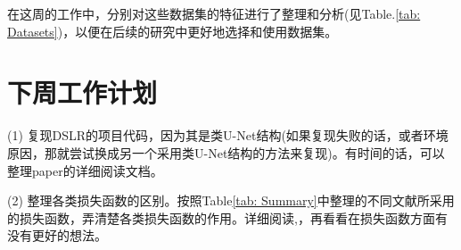 \documentclass[letterpaper,12pt]{article}
\begin{document}
		
		在这周的工作中，分别对这些数据集的特征进行了整理和分析(见Table.\ref{tab: Datasets})，以便在后续的研究中更好地选择和使用数据集。
		
	
	\section{下周工作计划}

	(1) 复现DSLR的项目代码，因为其是类U-Net结构(如果复现失败的话，或者环境原因，那就尝试换成另一个采用类U-Net结构的方法来复现)。有时间的话，可以整理paper的详细阅读文档。

	(2) 整理各类损失函数的区别。按照Table\ref{tab: Summary}中整理的不同文献所采用的损失函数，弄清楚各类损失函数的作用。详细阅读\cite{fang2020perceptual},\cite{talebi2018nima}，再看看在损失函数方面有没有更好的想法。
	
	
	
	
\end{document}
